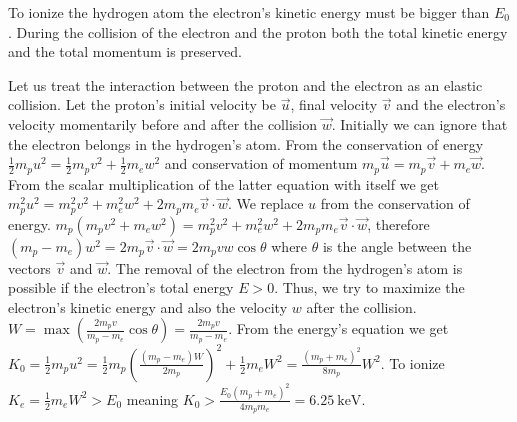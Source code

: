 \hinteng
To ionize the hydrogen atom the electron’s kinetic energy must be bigger than $E_0$. During the collision of the electron and the proton both the total kinetic energy and the total momentum is preserved.

\solueng
Let us treat the interaction between the proton and the electron as an elastic collision. Let the proton’s initial velocity be $\vec{u}$, final velocity $\vec{v}$ and the electron’s velocity momentarily before and after the collision $\vec{w}$. Initially we can ignore that the electron belongs in the hydrogen’s atom. From the conservation of energy $\frac{1}{2}m_p u^2 = \frac{1}{2}m_p v^2 + \frac{1}{2}m_e w^2$ and conservation of momentum $m_p \vec{u} = m_p \vec{v} + m_e \vec{w}$. From the scalar multiplication of the latter equation with itself we get $m_p^2 u^2 = m_p^2 v^2 + m_e^2 w^2 + 2 m_p m_e \vec{v}\cdot \vec{w}$. We replace $u$ from the conservation of energy. $m_p ( m_p v^2 + m_e w^2 ) = m_p^2 v^2 + m_e^2 w^2 + 2 m_p m_e \vec{v}\cdot \vec{w}$, therefore $( m_p - m_e ) w^2 = 2 m_p \vec{v}\cdot\vec{w} = 2 m_p vw \cos\theta$ where $\theta$ is the angle between the vectors $\vec{v}$ and $\vec{w}$. The removal of the electron from the hydrogen’s atom is possible if the electron’s total energy $E>0$. Thus, we try to maximize the electron’s kinetic energy and also the velocity $w$ after the collision. $W = \max\left(\frac{2 m_p v}{m_p - m_e}\cos\theta\right) = \frac{2 m_p v}{m_p - m_e}$. From the energy’s equation we get $K_0 = \frac{1}{2}m_p u^2 = \frac{1}{2}m_p \left(\frac{( m_p - m_e ) W}{2 m_p}\right)^2 + \frac{1}{2}m_e W^2 = \frac{(m_p + m_e)^2}{8 m_p} W^2$. To ionize $K_e = \frac{1}{2}m_e W^2 > E_0$ meaning $K_0 > \frac{E_0 (m_p + m_e)^2}{4 m_p m_e} = \SI{6.25}{\kilo\electronvolt}$.
\probend